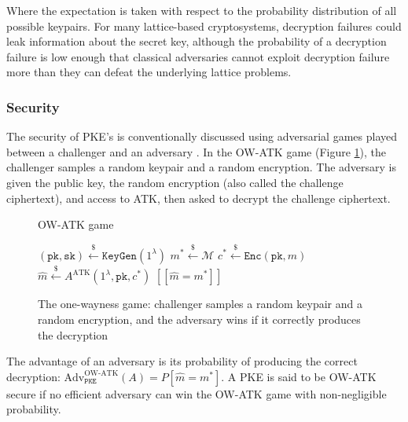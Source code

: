\documentclass[runningheads]{llncs}
\newcommand{\pke}{\texttt{PKE}}
\newcommand{\keygen}{\texttt{KeyGen}}
\newcommand{\encrypt}{\texttt{Enc}}
\newcommand{\pk}{\texttt{pk}}
\newcommand{\sk}{\texttt{sk}}
\newcommand{\leftsample}{\stackrel{\$}{\leftarrow}}
\newcommand{\llbrack}{[\![}
\newcommand{\rrbrack}{]\!]}
\begin{document}
Where the expectation is taken with respect to the probability distribution of all possible keypairs. For many lattice-based cryptosystems, decryption failures could leak information about the secret key, although the probability of a decryption failure is low enough that classical adversaries cannot exploit decryption failure more than they can defeat the underlying lattice problems.

\subsubsection{Security} The security of PKE's is conventionally discussed using adversarial games played between a challenger and an adversary \cite{DBLP:conf/stoc/GoldwasserM82}. In the OW-ATK game (Figure \ref{fig:pke-ow-atk-game}), the challenger samples a random keypair and a random encryption. The adversary is given the public key, the random encryption (also called the challenge ciphertext), and access to ATK, then asked to decrypt the challenge ciphertext.

\begin{figure}[h]
    \centering
    \begin{minipage}[t]{0.45\textwidth}
    \begin{algorithm}[H]
        \caption*{OW-ATK game}
        \begin{algorithmic}[1]
            \State $(\pk, \sk) \leftsample \keygen(1^\lambda)$
            \State $m^\ast \leftsample \mathcal{M}$
            \State $c^\ast \leftsample \encrypt(\pk, m)$
            \State $\hat{m} \leftsample A^\text{ATK}(1^\lambda, \pk, c^\ast)$
            \State \Return $\llbrack \hat{m} = m^\ast \rrbrack$
        \end{algorithmic}
    \end{algorithm}
    \end{minipage}
    \caption{The one-wayness game: challenger samples a random keypair and a random encryption, and the adversary wins if it correctly produces the decryption}\label{fig:pke-ow-atk-game}
\end{figure}

The advantage of an adversary is its probability of producing the correct decryption: $\text{Adv}^\text{OW-ATK}_\pke(A) = P[\hat{m} = m^\ast]$. A PKE is said to be OW-ATK secure if no efficient adversary can win the OW-ATK game with non-negligible probability.
\end{document}
